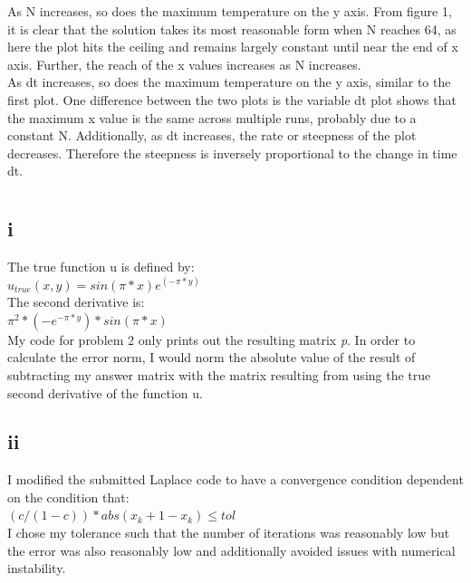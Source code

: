 \documentclass[10pt,a4paper]{article}
\begin{document}
\noindent
As N increases, so does the maximum temperature on the y axis. From figure 1, it is clear that the solution takes its most reasonable form when N reaches 64, as here the plot hits the ceiling and remains largely constant until near the end of x axis. Further, the reach of the x values increases as N increases. \\

\noindent
As dt increases, so does the maximum temperature on the y axis, similar to the first plot. One difference between the two plots is the variable dt plot shows that the maximum x value is the same across multiple runs, probably due to a constant N. Additionally, as dt increases, the rate or steepness of the plot decreases. Therefore the steepness is inversely proportional to the change in time dt.


\section{}

\subsection*{i}
The true function u is defined by: \\
$ u_{true}(x,y) = sin(\pi * x)e^{(-\pi * y)} $ \\
The second derivative is: \\
$ \pi^2 * (-e^{-\pi * y}) * sin(\pi * x) $ \\

\noindent
My code for problem 2 only prints out the resulting matrix \emph{p}. In order to calculate the error norm, I would norm the absolute value of the result of subtracting my answer matrix with the matrix resulting from using the true second derivative of the function u.

\subsection*{ii}

I modified the submitted Laplace code to have a convergence condition dependent on the condition that: \\

\noindent
$ (c / (1 - c))* abs(x_k+1 - x_k)  \leq tol$ \\

\noindent
I chose my tolerance such that the number of iterations was reasonably low but the error was also reasonably low and additionally avoided issues with numerical instability.
\end{document}
